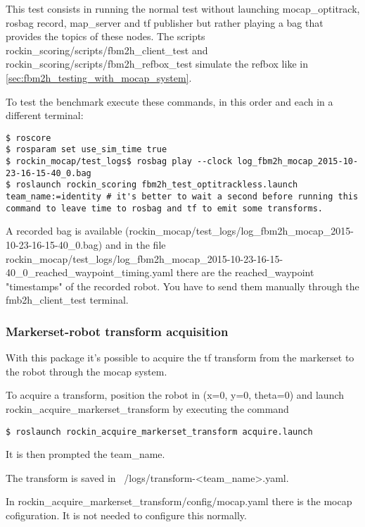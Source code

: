 \documentclass[a4paper]{article}
\begin{document}
This test consists in running the normal test without launching mocap\_optitrack, rosbag record, map\_server and tf publisher but rather playing a bag that provides the topics of these nodes.
The scripts rockin\_scoring/scripts/fbm2h\_client\_test and rockin\_scoring/scripts/fbm2h\_refbox\_test simulate the refbox like in \ref{sec:fbm2h_testing_with_mocap_system}.

To test the benchmark execute these commands, in this order and each in a different terminal:
\begin{verbatim}
$ roscore
$ rosparam set use_sim_time true
$ rockin_mocap/test_logs$ rosbag play --clock log_fbm2h_mocap_2015-10-23-16-15-40_0.bag
$ roslaunch rockin_scoring fbm2h_test_optitrackless.launch team_name:=identity # it's better to wait a second before running this command to leave time to rosbag and tf to emit some transforms.
\end{verbatim} 

A recorded bag is available (rockin\_mocap/test\_logs/log\_fbm2h\_mocap\_2015-10-23-16-15-40\_0.bag) and in the file rockin\_mocap/test\_logs/log\_fbm2h\_mocap\_2015-10-23-16-15-40\_0\_reached\_waypoint\_timing.yaml there are the reached\_waypoint "timestamps" of the recorded robot.
You have to send them manually through the fmb2h\_client\_test terminal.


\subsubsection{Markerset-robot transform acquisition}
\label{sec:fbm2h_transform_acquisition}

With this package it's possible to acquire the tf transform from the markerset to the robot through the mocap system.

To acquire a transform, position the robot in (x=0, y=0, theta=0) and launch rockin\_acquire\_markerset\_transform by executing the command
\begin{verbatim}
$ roslaunch rockin_acquire_markerset_transform acquire.launch
\end{verbatim} 
It is then prompted the team\_name.

The transform is saved in ~/logs/transform-<team\_name>.yaml.

In rockin\_acquire\_markerset\_transform/config/mocap.yaml there is the mocap cofiguration. It is not needed to configure this normally.


\clearpage

\end{document}
